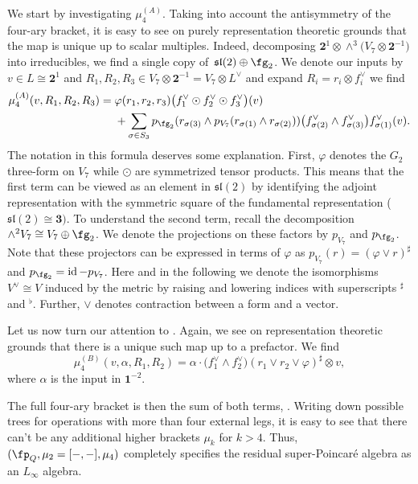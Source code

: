 \documentclass[pdftex]{sigma}
\numberwithin{equation}{section}
\theoremstyle{definition}
\DeclareMathOperator{\id}{id}
\begin{document}
We start by investigating $\mu_4^{(A)}$.
Taking into account the antisymmetry of the four-ary bracket, it is easy to see on purely representation theoretic grounds that the map is unique up to scalar multiples. Indeed, decomposing $\textbf{2}^1 \otimes \wedge^3\big(V_7 \otimes \textbf{2}^{-1}\big)$ into irreducibles, we find a single copy of~${\mathfrak{sl}(2) \oplus \fg_2}$. We denote our inputs by $v \in L \cong \textbf{2}^1$ and $R_1,R_2,R_3 \in V_7 \otimes \textbf{2}^{-1} = V_7 \otimes L^\vee$ and expand $R_i = r_i \otimes f_i^\vee$ we find
\begin{align*}%
 \mu_4^{(A)}(v, R_1, R_2 , R_3)
 ={}& \varphi(r_1,r_2,r_3) \big(f_1^\vee \odot f_2^\vee \odot f_3^\vee\big)(v) \\
 &+ \sum_{\sigma \in S_3} p_{\fg_2}( r_{\sigma(3)} \wedge p_{V_7}(r_{\sigma(1)} \wedge r_{\sigma(2)})) \big(f^\vee_{\sigma(2)} \wedge f^\vee_{\sigma(3)}\big) f^\vee_{\sigma(1)}(v).
\end{align*}
The notation in this formula deserves some explanation. First, $\varphi$ denotes the $G_2$ three-form on $V_7$ while $\odot$ are symmetrized tensor products. This means that the first term can be viewed as an element in $\mathfrak{sl}(2)$ by identifying the adjoint representation with the symmetric square of the fundamental representation ($\mathfrak{sl}(2) \cong \textbf{3})$. To understand the second term, recall the decomposition
$
 \wedge^2 V_7 \cong V_7 \oplus \fg_2 $.
We denote the projections on these factors by $p_{V_7}$ and $p_{\fg_2}$. Note that these projectors can be expressed in terms of $\varphi$ as
$
 p_{V_7}(r) = (\varphi \vee r)^\sharp$ and $ p_{\fg_2} = \id - p_{V_7}$.
Here and in the following we denote the isomorphisms $V^\vee \cong V$ induced by the metric by raising and lowering indices with superscripts $^\sharp$ and $^\flat$. Further, $\vee$ denotes contraction between a form and a vector.

Let us now turn our attention to .
Again, we see on representation theoretic grounds that there is a unique such map up to a prefactor. We find
\[
 \mu_4^{(B)}(v, \alpha, R_1, R_2) = \alpha \cdot \big(f_1^\vee \wedge f_2^\vee\big) (r_1 \vee r_2 \vee \varphi)^\sharp \otimes v ,
\]
where $\alpha$ is the input in $\textbf{1}^{-2}$.

The full four-ary bracket is then the sum of both terms, . Writing down possible trees for operations with more than four external legs, it is easy to see that there can't be any additional higher brackets $\mu_k$ for $k>4$. Thus, $(\fp_Q , \mu_2 = [-,-] , \mu_4)$ completely specifies the residual super-Poincar\'e algebra as an $L_\infty$ algebra.
\end{document}
